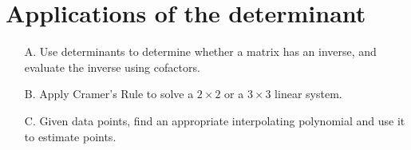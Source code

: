 \section{Applications of the determinant}

\begin{outcome}
\begin{enumerate}
\item[A.] Use determinants to determine whether a matrix has an inverse, and evaluate the inverse using cofactors. 

\item[B.] Apply Cramer's Rule to solve a $2\times 2$ or a $3\times 3$ linear
system.

\item[C.] Given data points, find an appropriate interpolating polynomial and use it to estimate points. 

\end{enumerate}
\end{outcome}
